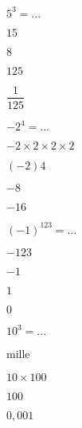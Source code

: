 
\begin{QCM}
\begin{GroupeQCM}

\begin{exercice}
$5^3=...$
\begin{ChoixQCM}{4}
\item $15$
\item $8$
\item $125$
\item $\dfrac{1}{125}$
\end{ChoixQCM}
\begin{corrige}
\end{corrige}
\end{exercice}

\begin{exercice}
$-2^4=...$
\begin{ChoixQCM}{4}
\item $-2 \times 2 \times 2 \times 2$
\item $(-2)4$
\item $-8$
\item $-16$
\end{ChoixQCM}
\begin{corrige}
\end{corrige}
\end{exercice}

\begin{exercice}
$\left(-1\right)^{123}=...$
\begin{ChoixQCM}{4}
\item $-123$
\item $-1$
\item $1$
\item $0$
\end{ChoixQCM}
\begin{corrige}
\end{corrige}
\end{exercice}

\begin{exercice}
$10^3=...$
\begin{ChoixQCM}{4}
\item mille
\item $10 \times 100$
\item $100$
\item $0,001$
\end{ChoixQCM}
\begin{corrige}
\end{corrige}
\end{exercice}


\end{GroupeQCM}
\end{QCM}
